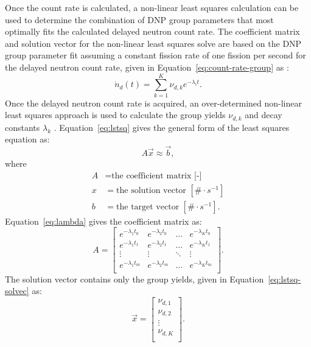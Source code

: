 \documentclass[hidelinks]{style/nseJournal}
\begin{document}
Once the count rate is calculated, a non-linear least squares calculation can be used to determine the combination of \gls{DNP} group parameters that most optimally fits the calculated delayed neutron count rate.
The coefficient matrix and solution vector for the non-linear least squares solve are based on the \gls{DNP} group parameter fit assuming a constant fission rate of one fission per second for the delayed neutron count rate, given in Equation~\eqref{eq:count-rate-group} as \cite{wilson2002delayed}:
\begin{equation}
    \dot{n}_d(t) = \sum_{k=1}^K \nu_{d,k} e^{-\lambda_i t}.
    \label{eq:count-rate-group}
\end{equation}
Once the delayed neutron count rate is acquired, an over-determined non-linear least squares approach is used to calculate the group yields $\nu_{d,k}$ and decay constants $\lambda_{k}$ \cite{brady1988evaluation, chandler1969stepit, waldo1981delayed}.
Equation~\eqref{eq:lstsq} gives the general form of the least squares equation as:
\begin{equation}
A \vec{x} \approx \vec{b},
\label{eq:lstsq}
\end{equation}
where
\begin{align}
    A &= \text{the coefficient matrix [-]} \nonumber \\
    x &= \text{the solution vector $[\# \cdot s^{-1}]$} \nonumber \\
    b &= \text{the target vector $[\# \cdot s^{-1}]$.} \nonumber
\end{align}
Equation~\eqref{eq:lambda} gives the coefficient matrix as:
\begin{equation}
A = \begin{bmatrix}
e^{-\lambda_1 t_0} & e^{-\lambda_2 t_0} & \hdots &  e^{-\lambda_K t_0}\\
e^{-\lambda_1 t_1} & e^{-\lambda_2 t_1} & \hdots &  e^{-\lambda_K t_1}\\
\vdots                       & \vdots                       & \ddots &  \vdots                      \\
e^{-\lambda_1 t_m} & e^{-\lambda_2 t_m} &  \hdots  & e^{-\lambda_K t_m}\\
\end{bmatrix}.
\label{eq:lambda}
\end{equation}
The solution vector contains only the group yields, given in Equation~\eqref{eq:lstsq-solvec} as:
\begin{equation}
\vec{x} = 
\begin{bmatrix}
{\nu}_{d, 1}\\
{\nu}_{d, 2}\\
\vdots\\
{\nu}_{d, K}\\
\end{bmatrix}.
\label{eq:lstsq-solvec}
\end{equation}
\end{document}
